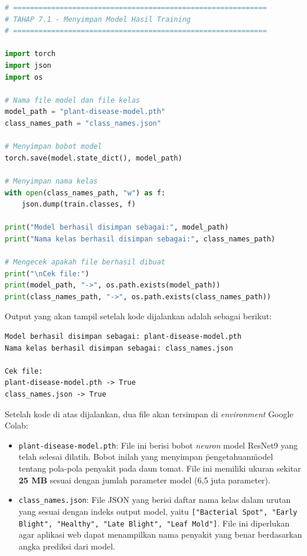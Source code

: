 \begin{lstlisting}[language=Python, caption=Menyimpan model hasil training]
# ============================================================
# TAHAP 7.1 - Menyimpan Model Hasil Training
# ============================================================

import torch
import json
import os

# Nama file model dan file kelas
model_path = "plant-disease-model.pth"
class_names_path = "class_names.json"

# Menyimpan bobot model
torch.save(model.state_dict(), model_path)

# Menyimpan nama kelas
with open(class_names_path, "w") as f:
    json.dump(train.classes, f)

print("Model berhasil disimpan sebagai:", model_path)
print("Nama kelas berhasil disimpan sebagai:", class_names_path)

# Mengecek apakah file berhasil dibuat
print("\nCek file:")
print(model_path, "->", os.path.exists(model_path))
print(class_names_path, "->", os.path.exists(class_names_path))
\end{lstlisting}

Output yang akan tampil setelah kode dijalankan adalah sebagai berikut:

\begin{outputcode}[H]
\begin{lstlisting}[language={}]
Model berhasil disimpan sebagai: plant-disease-model.pth
Nama kelas berhasil disimpan sebagai: class_names.json

Cek file:
plant-disease-model.pth -> True
class_names.json -> True
\end{lstlisting}
\caption{Output penyimpanan model}
\end{outputcode}

Setelah kode di atas dijalankan, dua file akan tersimpan di \textit{environment} Google Colab:

\begin{itemize}
    \item \texttt{plant-disease-model.pth}: File ini berisi bobot \textit{neuron} model ResNet9 yang telah selesai dilatih. Bobot inilah yang menyimpan \"pengetahuan\" model tentang pola-pola penyakit pada daun tomat. File ini memiliki ukuran sekitar \textbf{25 MB} sesuai dengan jumlah parameter model (6,5 juta parameter).
    \item \texttt{class\_names.json}: File JSON yang berisi daftar nama kelas dalam urutan yang sesuai dengan indeks output model, yaitu \texttt{["Bacterial Spot", "Early Blight", "Healthy", "Late Blight", "Leaf Mold"]}. File ini diperlukan agar aplikasi web dapat menampilkan nama penyakit yang benar berdasarkan angka prediksi dari model.
\end{itemize}

